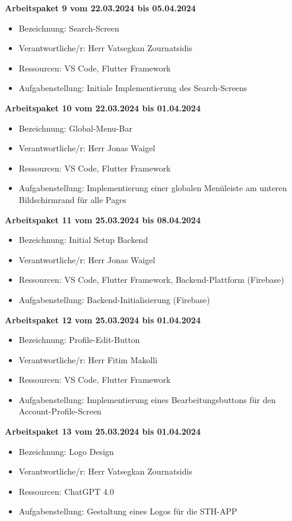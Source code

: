 \newpage
\textbf{Arbeitspaket 9 vom 22.03.2024 bis 05.04.2024}
\begin{itemize}[itemsep=0pt]
    \item{Bezeichnung: Search-Screen} 
	\item{Verantwortliche/r: Herr Vatsegkan Zournatsidis} 
	\item{Ressourcen: VS Code, Flutter Framework} 
    \item{Aufgabenstellung: Initiale Implementierung des Search-Screens}
\end{itemize}

\textbf{Arbeitspaket 10 vom 22.03.2024 bis 01.04.2024}
\begin{itemize}[itemsep=0pt]
    \item{Bezeichnung: Global-Menu-Bar} 
	\item{Verantwortliche/r: Herr Jonas Waigel} 
	\item{Ressourcen: VS Code, Flutter Framework} 
    \item{Aufgabenstellung: Implementierung einer globalen Menüleiste am unteren Bildschirmrand für alle Pages}
\end{itemize} 

\textbf{Arbeitspaket 11 vom 25.03.2024 bis 08.04.2024}
\begin{itemize}[itemsep=0pt]
    \item{Bezeichnung: Initial Setup Backend} 
	\item{Verantwortliche/r: Herr Jonas Waigel} 
	\item{Ressourcen: VS Code, Flutter Framework, Backend-Plattform (Firebase)}
    \item{Aufgabenstellung: Backend-Initialisierung (Firebase)}
\end{itemize}

\textbf{Arbeitspaket 12 vom 25.03.2024 bis 01.04.2024}
\begin{itemize}[itemsep=0pt]
    \item{Bezeichnung: Profile-Edit-Button} 
	\item{Verantwortliche/r: Herr Fitim Makolli} 
	\item{Ressourcen: VS Code, Flutter Framework} 
    \item{Aufgabenstellung: Implementierung eines Bearbeitungsbuttons für den Account-Profile-Screen}
\end{itemize}

\textbf{Arbeitspaket 13 vom 25.03.2024 bis 01.04.2024}
\begin{itemize}[itemsep=0pt]
    \item{Bezeichnung: Logo Design} 
	\item{Verantwortliche/r: Herr Vatsegkan Zournatsidis} 
	\item{Ressourcen: ChatGPT 4.0}
    \item{Aufgabenstellung: Gestaltung eines Logos für die STH-APP}
\end{itemize} 

